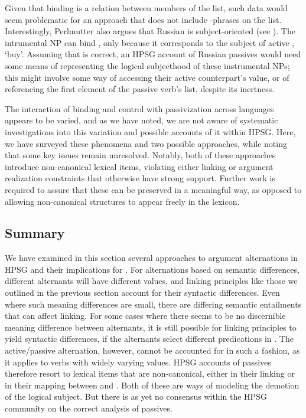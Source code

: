 \documentclass[output=paper
	        ,collection
	        ,collectionchapter
 	        ,biblatex
                ,babelshorthands
                ,newtxmath
                ,draftmode
                ,colorlinks, citecolor=brown
]{langscibook}
\begin{document}
Given that binding is a relation between members of the \argst list, such data would seem problematic for an approach that does not include -phrases on the \argst list.
Interestingly, Perlmutter also argues that Russian  is subject-oriented (see ).
The intrumental NP  can bind , only because it corresponds to the subject of active , `buy'.
Assuming that is correct, an HPSG account of Russian passives would need some means of representing the logical subjecthood of these instrumental NPs; this might involve some way of accessing their active counterpart's \subj value, or of referencing the first element of the passive verb's \argst list, despite its inertness.

The interaction of binding and control with passivization across languages appears to be varied, and as we have noted, we are not aware of systematic investigations into this variation and possible accounts of it within HPSG.
Here, we have surveyed these phenomena and two possible approaches, while noting that some key issues remain unresolved.
Notably, both of these approaches introduce non-canonical lexical items, violating either linking or argument realization constraints that otherwise have strong support. 
Further work is required to assure that these can be preserved in a meaningful way, as opposed to allowing non-canonical structures to appear freely in the lexicon.

\subsection{Summary}

We have examined in this section several approaches to argument alternations in HPSG and their implications for \argst.
For alternations based on semantic differences, different alternants will have different  values, and linking principles like those we outlined in the previous section account for their syntactic differences.
Even where such meaning differences are small, there are differing semantic entailments that can affect linking.
For some cases where there seems to be no discernible meaning difference between alternants, it is still possible for linking principles to yield syntactic differences, if the alternants select different  predications in .
The active/passive alternation, however, cannot be accounted for in such a fashion, as it applies to verbs with widely varying  values.
HPSG accounts of passives therefore resort to lexical items that are non-canonical, either in their linking or in their mapping between \argst and \val.
Both of these are ways of modeling the demotion of the logical subject.
But there is as yet no consensus within the HPSG community on the correct analysis of passives.
\end{document}
